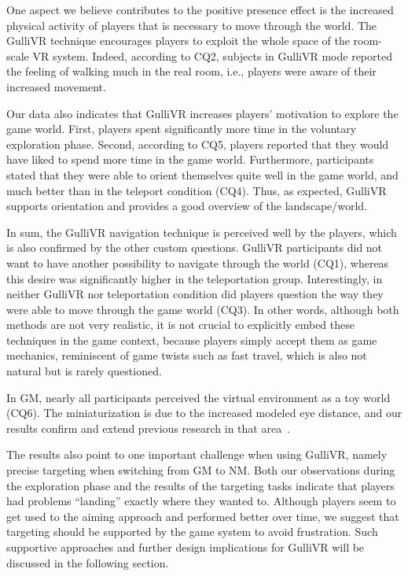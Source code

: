 \documentclass{sigchi}
\begin{document}
One aspect we believe contributes to the positive presence effect is the increased physical activity of players that is necessary to move through the world. The GulliVR technique encourages players to exploit the whole space of the room-scale VR system. Indeed, according to CQ2, subjects in GulliVR mode reported the feeling of walking much in the real room, i.e., players were aware of their increased movement.

Our data also indicates that GulliVR increases players' motivation to explore the game world. First, players spent significantly more time in the voluntary exploration phase. Second, according to CQ5, players reported that they would have liked to spend more time in the game world. Furthermore, participants stated that they were able to orient themselves quite well in the game world, and much better than in the teleport condition (CQ4). Thus, as expected, GulliVR supports orientation and provides a good overview of the landscape/world.

In sum, the GulliVR navigation technique is perceived well by the players, which is also confirmed by the other custom questions. GulliVR participants did not want to have another possibility to navigate through the world (CQ1), whereas this desire was significantly higher in the teleportation group. Interestingly, in neither GulliVR nor teleportation condition did players question the way they were able to move through the game world (CQ3). In other words, although both methods are not very realistic, it is not crucial to explicitly embed these techniques in the game context, because players simply accept them as game mechanics, reminiscent of game twists such as fast travel, which is also not natural but is rarely questioned.

In GM, nearly all participants perceived the virtual environment as a toy world (CQ6). The miniaturization is due to the increased modeled eye distance, and our results confirm and extend previous research in that area~\cite{wartell1999analytic, renner2015influence, van2011being}.

The results also point to one important challenge when using GulliVR, namely precise targeting when switching from GM to NM. Both our observations during the exploration phase and the results of the targeting tasks indicate that players had problems ``landing'' exactly where they wanted to. Although players seem to get used to the aiming approach and performed better over time, we suggest that targeting should be supported by the game system to avoid frustration. Such supportive approaches and further design implications for GulliVR will be discussed in the following section.
\end{document}
